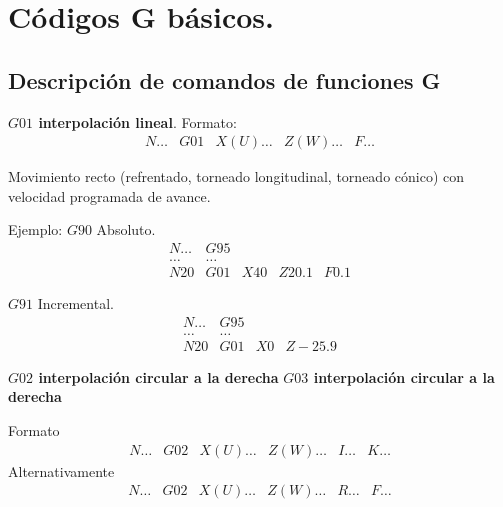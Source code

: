 \documentclass{article}
\begin{document}
\section{Códigos G básicos.}
\subsection*{Descripción de comandos de funciones G}

\textbf{$G01$ interpolación lineal}. Formato: 
\begin{equation*}
\begin{matrix}
    N\dots & G01 & X(U)\dots & Z(W)\dots & F\dots
\end{matrix}
\end{equation*}

Movimiento recto (refrentado, torneado longitudinal, torneado cónico) con velocidad programada de avance.

Ejemplo: $G90$ Absoluto.
\begin{equation*}
    \begin{matrix}
        N\dots & G95 \\
        \dots & \dots \\
        N20 &G01 &X40 &Z20.1 &F0.1
    \end{matrix}
\end{equation*}

$G91$ Incremental.
\begin{equation*}
    \begin{matrix}
        N\dots & G95 \\
        \dots & \dots \\
        N20 &G01 &X 0 &Z-25.9
    \end{matrix}
\end{equation*}

\textbf{$G02$ interpolación circular a la derecha}
\textbf{$G03$ interpolación circular a la derecha}

Formato
\begin{equation*}
\begin{matrix}
    N\dots & G02 & X(U)\dots & Z(W)\dots& I\dots & K\dots
\end{matrix}
\end{equation*}
Alternativamente
\begin{equation*}
\begin{matrix}
    N\dots & G02 & X(U)\dots & Z(W)\dots& R\dots & F\dots
\end{matrix}
\end{equation*}
\end{document}
